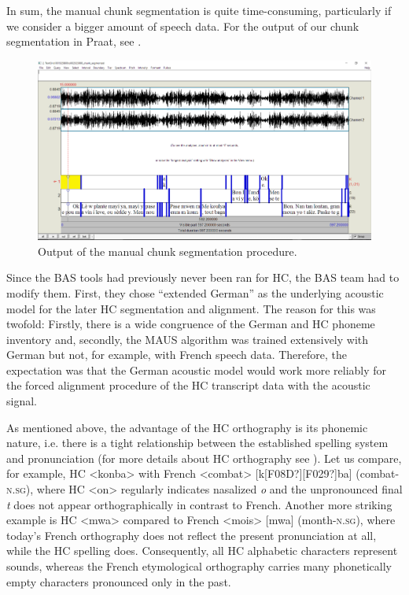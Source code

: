 \documentclass[output=paper]{langsci/langscibook}
\begin{document}
In sum, the manual chunk segmentation is quite time-consuming, particularly if we consider a bigger amount of speech data. For the output of our chunk segmentation in Praat, see .

\begin{figure}
\includegraphics[width=\textwidth]{figures/KALPeerreviewedkorr-img1.png}
\caption{\label{fig:kal:1} Output of the manual chunk segmentation procedure.}
\end{figure}

Since the BAS tools had previously never been ran for HC, the BAS team had to modify them. First, they chose “extended German” as the underlying acoustic model for the later HC segmentation and alignment. The reason for this was twofold: Firstly, there is a wide congruence of the German and HC phoneme inventory and, secondly, the MAUS algorithm was trained extensively with German but not, for example, with French speech data. Therefore, the expectation was that the German acoustic model would work more reliably for the forced alignment procedure of the HC transcript data with the acoustic signal.

As mentioned above, the advantage of the HC orthography is its phonemic nature, i.e. there is a tight relationship between the established spelling system and pronunciation (for more details about HC orthography see \citealt[x-xiii]{Valdman1981}). Let us compare, for example, HC <konba> with French <combat> [k[F08D?][F029?]ba] (combat-\textsc{n.sg}), where HC <on> regularly indicates nasalized \textit{o} and the unpronounced final \textit{t} does not appear orthographically in contrast to French. Another more striking example is HC <mwa> compared to French <mois> [mwa] (month-\textsc{n.sg}), where today’s French orthography does not reflect the present pronunciation at all, while the HC spelling does. Consequently, all HC alphabetic characters represent sounds, whereas the French etymological orthography carries many phonetically empty characters pronounced only in the past.
\end{document}
